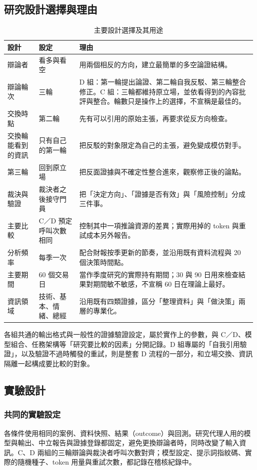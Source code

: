 \subsection{研究設計選擇與理由}
\begin{table}[H]\centering\small
\caption{主要設計選擇及其用途}
\begin{tabularx}{\textwidth}{@{}L{.17} L{.19} Y@{}}\toprule
設計 & 設定 & 理由 \\\midrule
辯論者 & 看多與看空 & 用兩個相反的方向，建立最簡單的多空論證結構。\\
辯論輪次 & 三輪 & D 組：第一輪提出論證、第二輪自我反駁、第三輪整合修正。C 組：三輪都維持原立場，並依看得到的內容批評與整合。輪數只是操作上的選擇，不宣稱是最佳的。\\
交換時點 & 第二輪 & 先有可以引用的原始主張，再要求從反方向檢查。\\
交換輪能看到的資訊 & 只有自己的第一輪 & 把反駁的對象限定為自己的主張，避免變成模仿對手。\\
第三輪 & 回到原立場 & 把反面證據與不確定性整合進來，觀察修正後的論點。\\
裁決與驗證 & 裁決者之後接守門員 & 把「決定方向」、「證據是否有效」與「風險控制」分成三件事。\\
主要比較 & C／D 預定呼叫次數相同 & 控制其中一項推論資源的差異；實際用掉的 token 與重試成本另外報告。\\
分析頻率 & 每季一次 & 配合財報按季更新的節奏，並沿用既有資料流程與 20 個決策時間點。\\
主要期間 & 60 個交易日 & 當作季度研究的實際持有期間；30 與 90 日用來檢查結果對期間敏不敏感，不宣稱 60 日在理論上最好。\\
資訊領域 & 技術、基本、情緒、總經 & 沿用既有四類證據，區分「整理資料」與「做決策」兩層的專業化。\\\bottomrule
\end{tabularx}\end{table}
各組共通的輸出格式與一般性的證據驗證設定，屬於實作上的參數，與 C／D、模型組合、任務架構等「研究要比較的因素」分開記錄。D 組專屬的「自我引用驗證」，以及驗證不過時觸發的重試，則是整套 D 流程的一部分，和立場交換、資訊隔離一起構成要比較的對象。

\subsection{實驗設計}

\subsubsection{共同的實驗設定}
各條件使用相同的案例、資料快照、結果（outcome）與回測。研究代理人用的模型與輸出、中立報告與證據登錄都固定，避免更換辯論者時，同時改變了輸入資訊。C、D 兩組的三輪辯論與裁決者呼叫次數對齊；模型設定、提示詞指紋碼、實際的隨機種子、token 用量與重試次數，都記錄在稽核紀錄中。

